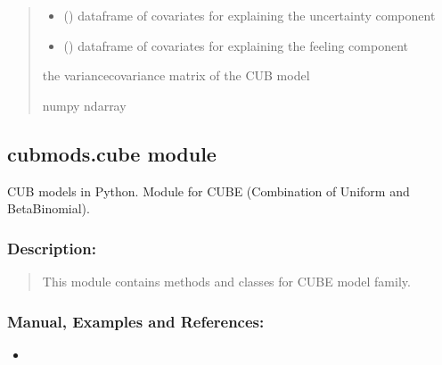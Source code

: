 \documentclass[letterpaper,10pt,english]{sphinxmanual}
\begin{document}
\begin{fulllineitems}
\begin{quote}
\begin{description}
\begin{itemize}
\item {} 
\sphinxAtStartPar
{} () \textendash{} dataframe of covariates for explaining the uncertainty component

\item {} 
\sphinxAtStartPar
{} () \textendash{} dataframe of covariates for explaining the feeling component

\end{itemize}

\sphinxAtStartPar
the variance\sphinxhyphen{}covariance matrix of the CUB model

\sphinxAtStartPar
numpy ndarray

\end{description}\end{quote}

\end{fulllineitems}



\subsection{cubmods.cube module}
\label{\detokenize{cubmods:module-cubmods.cube}}\label{\detokenize{cubmods:cubmods-cube-module}}\label{\detokenize{cubmods:cube000-module}}
\sphinxAtStartPar
CUB models in Python.
Module for CUBE (Combination of Uniform
and Beta\sphinxhyphen{}Binomial).


\subsubsection{Description:}
\label{\detokenize{cubmods:id16}}\begin{quote}

\sphinxAtStartPar
This module contains methods and classes
for CUBE model family.
\end{quote}


\subsubsection{Manual, Examples and References:}
\label{\detokenize{cubmods:id17}}\begin{itemize}
\item {} 
\sphinxAtStartPar
{}

\end{itemize}
\end{document}
